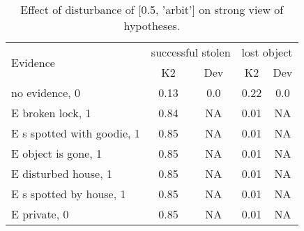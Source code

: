 \begin{table}\begin{tabular}{l|cc|cc}\toprule\multirow{2}{*}{Evidence} & \multicolumn{2}{c}{successful stolen}& \multicolumn{2}{c}{lost object}\\& {K2} & {Dev}& {K2} & {Dev}\\\midrule
no evidence, 0 & \cellcolor{Bittersweet}0.13&\cellcolor{Bittersweet}0.0&\cellcolor{Bittersweet}0.22&\cellcolor{Bittersweet}0.0\\E broken lock, 1 & \cellcolor{Bittersweet}0.84&\cellcolor{Bittersweet}NA&\cellcolor{Bittersweet}0.01&\cellcolor{Bittersweet}NA\\E s spotted with goodie, 1 & \cellcolor{Bittersweet}0.85&\cellcolor{Bittersweet}NA&\cellcolor{Bittersweet}0.01&\cellcolor{Bittersweet}NA\\E object is gone, 1 & \cellcolor{Bittersweet}0.85&\cellcolor{Bittersweet}NA&\cellcolor{Bittersweet}0.01&\cellcolor{Bittersweet}NA\\E disturbed house, 1 & \cellcolor{Bittersweet}0.85&\cellcolor{Bittersweet}NA&\cellcolor{Bittersweet}0.01&\cellcolor{Bittersweet}NA\\E s spotted by house, 1 & \cellcolor{Bittersweet}0.85&\cellcolor{Bittersweet}NA&\cellcolor{Bittersweet}0.01&\cellcolor{Bittersweet}NA\\E private, 0 & \cellcolor{Bittersweet}0.85&\cellcolor{Bittersweet}NA&\cellcolor{Bittersweet}0.01&\cellcolor{Bittersweet}NA\\\bottomrule\end{tabular}\caption{Effect of disturbance of [0.5, 'arbit'] on strong view of hypotheses.}\end{table}